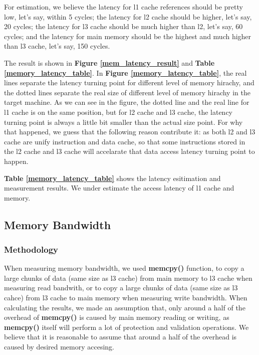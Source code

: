 For estimation, we believe the latency for l1 cache references should be pretty low, let's say, within 5 cycles; the latency for l2 cache should be higher, let's say, 20 cycles; the latency for l3 cache should be much higher than l2, let's say, 60 cycles; and the latency for main memory should be the highest and much higher than l3 cache, let's say, 150 cycles.

The result is shown in \textbf{Figure \ref{mem_latency_result}} and \textbf{Table \ref{memory_latency_table}}. In \textbf{Figure \ref{memory_latency_table}}, the real lines separate the latency turning point for different level of memory hirachy, and the dotted lines separate the real size of different level of memory hirachy in the target machine. As we can see in the figure, the dotted line and the real line for l1 cache is on the same position, but for l2 cache and l3 cache, the latency turning point is always a little bit smaller than the actual size point. For why that happened, we guess that the following reason contribute it: as both l2 and l3 cache are unify instruction and data cache, so that some instructions stored in the l2 cache and l3 cache will accelarate that data access latency turning point to happen.

\textbf{Table \ref{memory_latency_table}} shows the latency esitimation and measurement results. We under estimate the access latency of l1 cache and memory.

\subsection{Memory Bandwidth}

\subsubsection{Methodology}

When measuring memory bandwidth, we used \textbf{memcpy()} function, to copy a large chunks of data (same size as l3 cache) from main memory to l3 cache when measuring read bandwith, or to copy a large chunks of data (same size as l3 cahce) from l3 cache to main memory when measuring write bandwidth. When calculating the results, we made an assumption that, only around a half of the overhead of \textbf{memcpy()} is caused by main memory reading or writing, as \textbf{memcpy()} itself will perform a lot of protection and validation operations. We believe that it is reasonable to assume that around a half of the overhead is caused by desired memory accesing.


